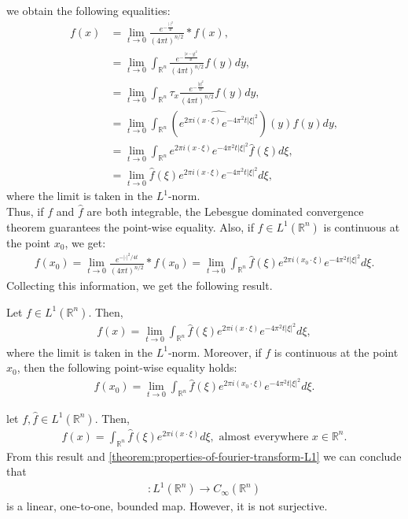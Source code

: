 we obtain the following equalities:
\begin{align*}
  f(x)&=\lim_{t \rightarrow 0}\frac{e^{-\frac{|\cdot|^2}{4t}}}{(4\pi t)^{n/2}}*f(x),\\
  &=\lim_{t \rightarrow 0}\int_{\mathbb{R}^{n}}\frac{e^{-\frac{|x-y|^2}{4t}}}{(4\pi t)^{n/2}}f(y)dy,\\
  &=\lim_{t \rightarrow 0}\int_{\mathbb{R}^{n}}\tau_{x}\frac{e^{-\frac{|y|^2}{4t}}}{(4\pi t)^{n/2}}f(y)dy,\\
  &=\lim_{t \rightarrow 0}\int_{\mathbb{R}^{n}}(\hat{e^{2\pi i(x\cdot \xi)}e^{-4\pi^2t|\xi|^2}})(y)f(y)dy,\\
  &=\lim_{t \rightarrow 0}\int_{\mathbb{R}^{n}}e^{2\pi i(x\cdot \xi)}e^{-4\pi^2t|\xi|^2}\hat{f}(\xi)d\xi,\\
  &=\lim_{t \rightarrow 0}\hat{f}(\xi)e^{2\pi i(x\cdot \xi)}e^{-4\pi^2t|\xi|^2}d\xi,
\end{align*}
where the limit is taken in the $L^1$-norm.\\
Thus, if $f$ and $\hat{f}$ are both integrable, the Lebesgue dominated convergence theorem guarantees the point-wise equality. Also, if $f \in L^{1}(\mathbb{R}^{n})$ is continuous at the point $x_0$, we get:
\begin{align*}
  f(x_0)=\lim_{t \rightarrow 0}\frac{e^{-|\cdot|^2/4t}}{(4\pi t)^{n/2}}*f(x_0)=\lim_{t \rightarrow 0}\int_{\mathbb{R}^{n}}\hat{f}(\xi)e^{2\pi i(x_0\cdot \xi)}e^{-4\pi^2t|\xi|^2}d\xi.  
\end{align*}
Collecting this information, we get the following result.
\begin{proposition}{}
  Let $f\in L^{1}(\mathbb{R}^{n})$. Then,
  \begin{align*}
    f(x)=\lim_{t \rightarrow 0}\int_{\mathbb{R}^{n}}\hat{f}(\xi)e^{2\pi i (x\cdot \xi)}e^{-4\pi^2 t |\xi|^2}d\xi,
  \end{align*}
  where the limit is taken in the $L^1$-norm. Moreover, if $f$ is continuous at the point $x_0$, then the following point-wise equality holds:
  \begin{align*}
    f(x_0)=\lim_{t \rightarrow 0}\int_{\mathbb{R}^{n}}\hat{f}(\xi)e^{2\pi i (x_0\cdot \xi)}e^{-4\pi^2 t |\xi|^2}d\xi.
  \end{align*}
\end{proposition}
let $f,\hat{f}\in L^1(\mathbb{R}^{n})$. Then,
\begin{align*}
  f(x)=\int_{\mathbb{R}^{n}}\hat{f}(\xi)e^{2\pi i(x\cdot \xi)}d\xi, \text{ almost everywhere }x\in\mathbb{R}^{n}.
\end{align*}
From this result and \cref{theorem:properties-of-fourier-transform-L1} we can conclude that
\begin{align*}
  \hat{}:L^1(\mathbb{R}^{n})\to C_{\infty}(\mathbb{R}^{n})
\end{align*}
is a linear, one-to-one, bounded map. However, it is not surjective.

